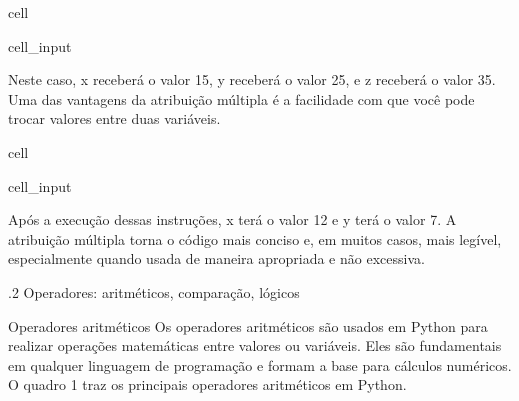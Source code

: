 \documentclass[letterpaper,10pt,english]{jupyterBook}
\begin{document}
\begin{sphinxuseclass}{cell}\begin{sphinxVerbatimInput}

\begin{sphinxuseclass}{cell_input}
\begin{sphinxVerbatim}[commandchars=\\\{\}]
      
\end{sphinxVerbatim}

\end{sphinxuseclass}\end{sphinxVerbatimInput}

\end{sphinxuseclass}
\sphinxAtStartPar
Neste caso, x receberá o valor 15, y receberá o valor 25, e z receberá o valor 35.
Uma das vantagens da atribuição múltipla é a facilidade com que você pode trocar valores entre duas variáveis.

\begin{sphinxuseclass}{cell}\begin{sphinxVerbatimInput}

\begin{sphinxuseclass}{cell_input}
\begin{sphinxVerbatim}[commandchars=\\\{\}]
  
  
    
\end{sphinxVerbatim}

\end{sphinxuseclass}\end{sphinxVerbatimInput}

\end{sphinxuseclass}
\sphinxAtStartPar
Após a execução dessas instruções, x terá o valor 12 e y terá o valor 7.
A atribuição múltipla torna o código mais conciso e, em muitos casos, mais legível, especialmente quando usada de maneira apropriada e não excessiva.

.2 Operadores: aritméticos, comparação, lógicos

\sphinxAtStartPar
Operadores aritméticos
Os operadores aritméticos são usados em Python para realizar operações matemáticas entre valores ou variáveis. Eles são fundamentais em qualquer linguagem de programação e formam a base para cálculos numéricos. O quadro 1 traz os principais operadores aritméticos em Python.
\end{document}
